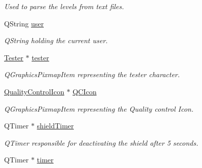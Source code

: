 \begin{DoxyCompactItemize}
\begin{DoxyCompactList}\small\item\em Used to parse the levels from text files. \end{DoxyCompactList}\item 
\hypertarget{classGame2Scene_a03c78504fc8e5179a885307c8bf83c46}{Q\-String \hyperlink{classGame2Scene_a03c78504fc8e5179a885307c8bf83c46}{user}}\label{classGame2Scene_a03c78504fc8e5179a885307c8bf83c46}

\begin{DoxyCompactList}\small\item\em Q\-String holding the current user. \end{DoxyCompactList}\item 
\hypertarget{classGame2Scene_afb38ecf3a022b0f3f9102a507b4f60dd}{\hyperlink{classTester}{Tester} $\ast$ \hyperlink{classGame2Scene_afb38ecf3a022b0f3f9102a507b4f60dd}{tester}}\label{classGame2Scene_afb38ecf3a022b0f3f9102a507b4f60dd}

\begin{DoxyCompactList}\small\item\em Q\-Graphics\-Pixmap\-Item representing the tester character. \end{DoxyCompactList}\item 
\hypertarget{classGame2Scene_a176aa28a3941af04cb1f04b4a4d1f8c6}{\hyperlink{classQualityControlIcon}{Quality\-Control\-Icon} $\ast$ \hyperlink{classGame2Scene_a176aa28a3941af04cb1f04b4a4d1f8c6}{Q\-C\-Icon}}\label{classGame2Scene_a176aa28a3941af04cb1f04b4a4d1f8c6}

\begin{DoxyCompactList}\small\item\em Q\-Graphics\-Pixmap\-Item representing the Quality control Icon. \end{DoxyCompactList}\item 
\hypertarget{classGame2Scene_abd4d448b96cb584c41b5eb13ad7c100d}{Q\-Timer $\ast$ \hyperlink{classGame2Scene_abd4d448b96cb584c41b5eb13ad7c100d}{shield\-Timer}}\label{classGame2Scene_abd4d448b96cb584c41b5eb13ad7c100d}

\begin{DoxyCompactList}\small\item\em Q\-Timer responsible for deactivating the shield after 5 seconds. \end{DoxyCompactList}\item 
\hypertarget{classGame2Scene_a5a48dcdfc71f2f9cc3c7c37755b31b9e}{Q\-Timer $\ast$ \hyperlink{classGame2Scene_a5a48dcdfc71f2f9cc3c7c37755b31b9e}{timer}}\label{classGame2Scene_a5a48dcdfc71f2f9cc3c7c37755b31b9e}


\end{DoxyCompactItemize}
